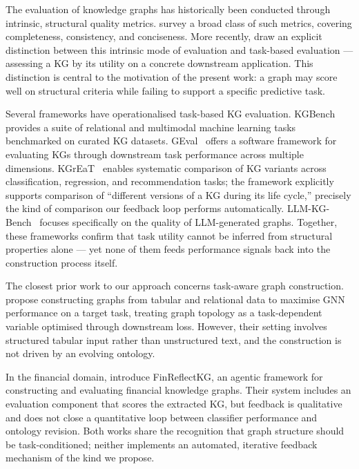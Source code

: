 The evaluation of knowledge graphs has historically been conducted through intrinsic,
structural quality metrics. \citet{paulheim2017kgquality} survey a broad class of such
metrics, covering completeness, consistency, and conciseness. More recently,
\citet{paulheim2024structuralquality} draw an explicit distinction between this intrinsic
mode of evaluation and task-based evaluation --- assessing a KG by its utility on
a concrete downstream application. This distinction is central to the motivation of the
present work: a graph may score well on structural criteria while failing to support a
specific predictive task.

Several frameworks have operationalised task-based KG evaluation. KGBench~\cite{bloem2021kgbench}
provides a suite of relational and multimodal machine learning tasks benchmarked on
curated KG datasets. GEval~\cite{choi2020geval} offers a software framework for evaluating
KGs through downstream task performance across multiple dimensions.
KGrEaT~\cite{heist2023kgreat} enables systematic comparison of KG variants across
classification, regression, and recommendation tasks; the framework explicitly supports
comparison of ``different versions of a KG during its life cycle,'' precisely the kind of
comparison our feedback loop performs automatically. LLM-KG-Bench~\cite{aksw2024llmkgbench}
focuses specifically on the quality of LLM-generated graphs. Together, these frameworks
confirm that task utility cannot be inferred from structural properties alone --- yet none
of them feeds performance signals back into the construction process itself.

The closest prior work to our approach concerns task-aware graph construction.
\citet{cucumides2025augraph} propose constructing graphs from tabular and relational data
to maximise GNN performance on a target task, treating graph topology as a
task-dependent variable optimised through downstream loss. However, their setting
involves structured tabular input rather than unstructured text, and the construction is
not driven by an evolving ontology.

In the financial domain, \citet{arun2025finreflectkg} introduce FinReflectKG, an agentic
framework for constructing and evaluating financial knowledge graphs. Their system includes
an evaluation component that scores the extracted KG, but feedback is qualitative and does
not close a quantitative loop between classifier performance and ontology revision. Both
works share the recognition that graph structure should be task-conditioned; neither
implements an automated, iterative feedback mechanism of the kind we propose.

